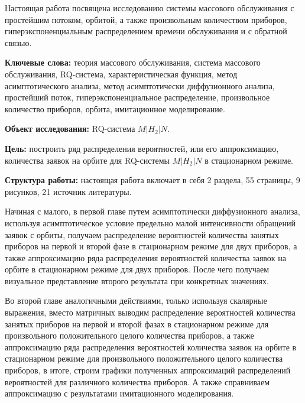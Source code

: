 \hspace*{\parindent}%
Настоящая работа посвящена исследованию системы массового обслуживания с простейшим потоком, орбитой, а также произвольным количеством приборов, гиперэкспоненциальным распределением времени обслуживания и с обратной связью.

\textbf{Ключевые слова:} теория массового обслуживания, система массового обслуживания, RQ-система, характеристическая функция, метод асимптотического анализа, метод асимптотически диффузионного анализа, простейший поток, гиперэкспоненциальное распределение, произвольное количество приборов, орбита, имитационное моделирование.

\textbf{Объект исследования:} RQ-система $M|H_2|N$.

\textbf{Цель:} построить ряд распределения вероятностей, или его аппроксимацию, количества заявок на орбите для RQ-системы $M|H_2|N$ в стационарном режиме.

\textbf{Структура работы:} настоящая работа включает в себя 2 раздела, 55 страницы, 9 рисунков, 21 источник литературы.

Начиная с малого, в первой главе путем асимптотически диффузионного анализа, используя асимптотическое условие предельно малой интенсивности обращений заявок с орбиты, получаем распределение вероятностей количества занятых приборов на первой и второй фазе в стационарном режиме для двух приборов, а также аппроксимацию ряда распределения вероятностей количества заявок на орбите в стационарном режиме для двух приборов. После чего получаем визуальное представление второго результата при конкретных значениях. 

Во второй главе аналогичными действиями, только используя скалярные выражения, вместо матричных выводим распределение вероятностей количества занятых приборов на первой и второй фазах в стационарном режиме для произвольного положительного целого количества приборов, а также аппроксимацию ряда распределения вероятностей количества заявок на орбите в стационарном режиме для произвольного положительного целого количества приборов, в итоге, строим графики полученных аппроксимаций распределений вероятностей для различного количества приборов. А также справниваем аппроксимацию с результатами имитационного моделирования.
